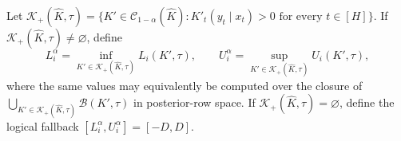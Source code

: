 Let \(\mathcal K_+(\widehat K,\tau)=\{K'\in\mathcal C_{1-\alpha}(\widehat K):K'_t(y_t\mid x_t)>0\text{ for every }t\in[H]\}\).  If \(\mathcal K_+(\widehat K,\tau)\ne\varnothing\), define
\[
 L_i^{\alpha}=\inf_{K'\in\mathcal K_+(\widehat K,\tau)}L_i(K',\tau),
 \qquad
 U_i^{\alpha}=\sup_{K'\in\mathcal K_+(\widehat K,\tau)}U_i(K',\tau),
\]
where the same values may equivalently be computed over the closure of \(\bigcup_{K'\in\mathcal K_+(\widehat K,\tau)}\mathcal B(K',\tau)\) in posterior-row space.  If \(\mathcal K_+(\widehat K,\tau)=\varnothing\), define the logical fallback \([L_i^{\alpha},U_i^{\alpha}]=[-D,D]\).
